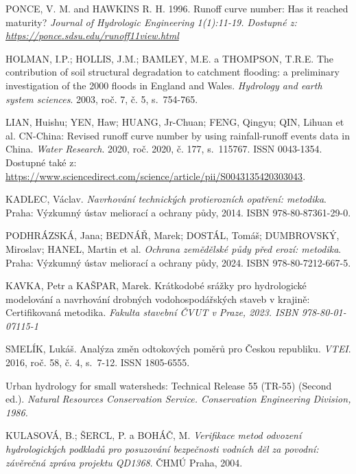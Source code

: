 \documentclass[a4paper,oneside,12pt]{book}
\begin{document}
\begin{thebibliography}{1}
PONCE, V. M. and HAWKINS R. H. 1996. Runoff curve number: Has it reached maturity?
\textit{ Journal of Hydrologic Engineering 1(1):11-19. Dostupné z: \href{https://ponce.sdsu.edu/runoff11view.html}
{https://ponce.sdsu.edu/runoff11view.html}}

HOLMAN, I.P.; HOLLIS, J.M.; BAMLEY, M.E. a THOMPSON, T.R.E. The contribution of soil structural degradation to catchment flooding: a preliminary investigation of the 2000 floods in England and Wales. \textit{Hydrology and earth system sciences}. 2003, roč. 7, č. 5, s.~754-765.

LIAN, Huishu; YEN, Haw; HUANG, Jr-Chuan; FENG, Qingyu; QIN, Lihuan et al. CN-China: Revised runoff curve number by using rainfall-runoff events data in China. \textit{Water Research}. 2020, roč. 2020, č. 177, s.~115767. ISSN 0043-1354. Dostupné také z: \url{https://www.sciencedirect.com/science/article/pii/S0043135420303043}.

KADLEC, Václav. \textit{Navrhování technických protierozních opatření: metodika}. Praha: Výzkumný ústav meliorací a ochrany půdy, 2014. ISBN 978-80-87361-29-0.


PODHRÁZSKÁ, Jana; BEDNÁŘ, Marek; DOSTÁL, Tomáš; DUMBROVSKÝ, Miroslav; HANEL, Martin et al. \textit{Ochrana zemědělské půdy před erozí: metodika}. Praha: Výzkumný ústav meliorací a ochrany půdy, 2024. ISBN 978-80-7212-667-5.

KAVKA, Petr a KAŠPAR, Marek. Krátkodobé srážky pro hydrologické modelování a navrhování drobných vodohospodářských staveb v krajině: Certifikovaná metodika.
\textit{ Fakulta stavební ČVUT v Praze, 2023. ISBN 978-80-01-07115-1}

SMELÍK, Lukáš. Analýza změn odtokových poměrů pro Českou republiku. \textit{VTEI}. 2016, roč. 58, č. 4, s.~7-12. ISSN 1805-6555.

Urban hydrology for small watersheds: Technical Release 55 (TR-55) (Second ed.).
\textit{ Natural Resources Conservation Service. Conservation Engineering Division, 1986.}

KULASOVÁ, B.; ŠERCL, P. a BOHÁČ, M. \textit{Verifikace metod odvození hydrologických podkladů pro posuzování bezpečnosti vodních děl za povodní: závěrečná zpráva projektu QD1368}. ČHMÚ Praha, 2004.




\end{thebibliography}
\end{document}
